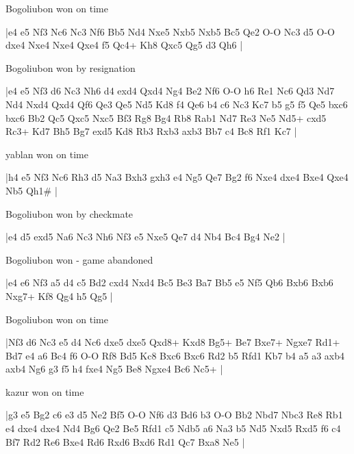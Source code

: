 \showboard

Bogoliubon won on time

\makegametitle
|e4 e5 Nf3 Nc6 Nc3 Nf6 Bb5 Nd4 Nxe5 Nxb5 Nxb5 Bc5 Qe2 O-O Nc3 d5 O-O dxe4 Nxe4 Nxe4 Qxe4 f5 Qc4+ Kh8 Qxc5 Qg5 d3 Qh6  |

\showboard

Bogoliubon won by resignation

\makegametitle
|e4 e5 Nf3 d6 Nc3 Nh6 d4 exd4 Qxd4 Ng4 Be2 Nf6 O-O h6 Re1 Nc6 Qd3 Nd7 Nd4 Nxd4 Qxd4 Qf6 Qe3 Qe5 Nd5 Kd8 f4 Qe6 b4 c6 Nc3 Kc7 b5 g5 f5 Qe5 bxc6 bxc6 Bb2 Qc5 Qxc5 Nxc5 Bf3 Rg8 Bg4 Rb8 Rab1 Nd7 Re3 Ne5 Nd5+ cxd5 Rc3+ Kd7 Bh5 Bg7 exd5 Kd8 Rb3 Rxb3 axb3 Bb7 c4 Bc8 Rf1 Kc7  |

\showboard

yablan won on time

\makegametitle
|h4 e5 Nf3 Nc6 Rh3 d5 Na3 Bxh3 gxh3 e4 Ng5 Qe7 Bg2 f6 Nxe4 dxe4 Bxe4 Qxe4 Nb5 Qh1\#  |

\showboard

Bogoliubon won by checkmate

\makegametitle
|e4 d5 exd5 Na6 Nc3 Nh6 Nf3 e5 Nxe5 Qe7 d4 Nb4 Bc4 Bg4 Ne2  |

\showboard

Bogoliubon won - game abandoned

\makegametitle
|e4 e6 Nf3 a5 d4 c5 Bd2 cxd4 Nxd4 Bc5 Be3 Ba7 Bb5 e5 Nf5 Qb6 Bxb6 Bxb6 Nxg7+ Kf8 Qg4 h5 Qg5  |

\showboard

Bogoliubon won on time

\makegametitle
|Nf3 d6 Nc3 e5 d4 Nc6 dxe5 dxe5 Qxd8+ Kxd8 Bg5+ Be7 Bxe7+ Ngxe7 Rd1+ Bd7 e4 a6 Bc4 f6 O-O Rf8 Bd5 Kc8 Bxc6 Bxc6 Rd2 b5 Rfd1 Kb7 b4 a5 a3 axb4 axb4 Ng6 g3 f5 h4 fxe4 Ng5 Be8 Ngxe4 Bc6 Nc5+  |

\showboard

kazur won on time

\makegametitle
|g3 e5 Bg2 c6 e3 d5 Ne2 Bf5 O-O Nf6 d3 Bd6 b3 O-O Bb2 Nbd7 Nbc3 Re8 Rb1 e4 dxe4 dxe4 Nd4 Bg6 Qe2 Be5 Rfd1 c5 Ndb5 a6 Na3 b5 Nd5 Nxd5 Rxd5 f6 c4 Bf7 Rd2 Re6 Bxe4 Rd6 Rxd6 Bxd6 Rd1 Qc7 Bxa8 Ne5  |


